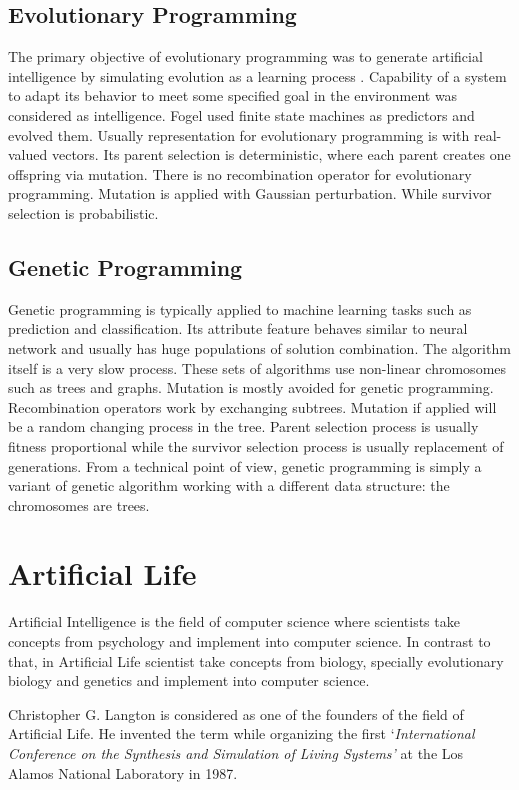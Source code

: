 \subsection{Evolutionary Programming}
The primary objective of evolutionary programming was to generate artificial intelligence by simulating evolution as a learning process \cite{fogel1966}. Capability of a system to adapt its behavior to meet some specified goal in the environment was considered as intelligence. Fogel used finite state machines as predictors and evolved them. Usually representation for evolutionary programming is with real-valued vectors. Its parent selection is deterministic, where each parent creates one offspring via mutation. There is no recombination operator for evolutionary programming. Mutation is applied with Gaussian perturbation. While survivor selection is probabilistic. 

\subsection{Genetic Programming}
Genetic programming is typically applied to machine learning tasks such as prediction and classification. Its attribute feature behaves similar to neural network and usually has huge populations of solution combination. The algorithm itself is a very slow process. These sets of algorithms use non-linear chromosomes such as trees and graphs. Mutation is mostly avoided for genetic programming. Recombination operators work by exchanging subtrees. Mutation if applied will be a random changing process in the tree. Parent selection process is usually fitness proportional while the survivor selection process is usually replacement of generations. From a technical point of view, genetic programming is simply a variant of genetic algorithm working with a different data structure: the chromosomes are trees. 

\section{Artificial Life}
Artificial Intelligence is the field of computer science where scientists take concepts from psychology and implement into computer science. In contrast to that, in Artificial Life scientist take concepts from biology, specially evolutionary biology and genetics and implement into computer science. 

Christopher G. Langton is considered as one of the founders of the field of Artificial Life. He invented the term while organizing the first `\textsl{International Conference on the Synthesis and Simulation of Living Systems'} at the Los Alamos National Laboratory in 1987.

